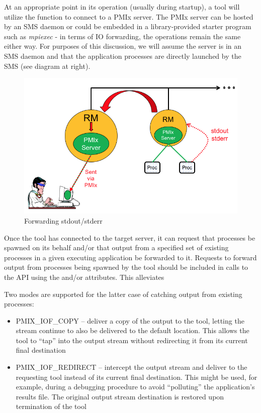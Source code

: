 At an appropriate point in its operation (usually during startup), a tool will utilize the  function to connect to a \ac{PMIx} server. The \ac{PMIx} server can be hosted by an \ac{SMS} daemon or could be embedded in a library-provided starter program such as \textit{mpiexec} - in terms of \ac{IO} forwarding, the operations remain the same either way. For purposes of this discussion, we will assume the server is in an \ac{SMS} daemon and that the application processes are directly launched by the \ac{SMS} (see diagram at right).

\begin{figure}
  \begin{center}
    \includegraphics[clip,width=0.98\linewidth]{figs/output.png}
  \end{center}
    \caption{Forwarding stdout/stderr}
    \label{fig:stdouterr}
\end{figure}

Once the tool has connected to the target server, it can request that processes be spawned on its behalf and/or that output from a specified set of existing processes in a given executing application be forwarded to it. Requests to forward output from processes being spawned by the tool should be included in calls to the  \ac{API} using the  and/or  attributes. This alleviates

Two modes are supported for the latter case of catching output from existing processes:

\begin{itemize}
    \item PMIX_IOF_COPY – deliver a copy of the output to the tool, letting the stream continue to also be delivered to the default location. This allows the tool to “tap” into the output stream without redirecting it from its current final destination
    \item PMIX_IOF_REDIRECT – intercept the output stream and deliver to the requesting tool instead of its current final destination. This might be used, for example, during a debugging procedure to avoid “polluting” the application’s results file. The original output stream destination is restored upon termination of the tool
\end{itemize}


